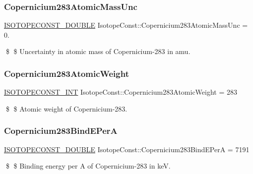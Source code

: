 \subsubsection{\texorpdfstring{Copernicium283\+Atomic\+Mass\+Unc}{Copernicium283AtomicMassUnc}}
{\footnotesize\ttfamily \mbox{\hyperlink{group___isotope_const-_macros_ga8f45a7272ce02c0b4c65c44636ed719a}{I\+S\+O\+T\+O\+P\+E\+C\+O\+N\+S\+T\+\_\+\+D\+O\+U\+B\+LE}} Isotope\+Const\+::\+Copernicium283\+Atomic\+Mass\+Unc = 0.}

\$ \$ Uncertainty in atomic mass of Copernicium-\/283 in amu. \mbox{\label{group___isotope_const-_copernicium-_cn283_ga2036d7cb39096d47da7e7fb48fffa395}} 
\subsubsection{\texorpdfstring{Copernicium283\+Atomic\+Weight}{Copernicium283AtomicWeight}}
{\footnotesize\ttfamily \mbox{\hyperlink{group___isotope_const-_macros_ga5f18360b3e99483a35c32d789e62621c}{I\+S\+O\+T\+O\+P\+E\+C\+O\+N\+S\+T\+\_\+\+I\+NT}} Isotope\+Const\+::\+Copernicium283\+Atomic\+Weight = 283}

\$ \$ Atomic weight of Copernicium-\/283. \mbox{\label{group___isotope_const-_copernicium-_cn283_gac5bb7a19ffcc44ecf3b23b838dceaf57}} 
\subsubsection{\texorpdfstring{Copernicium283\+Bind\+E\+PerA}{Copernicium283BindEPerA}}
{\footnotesize\ttfamily \mbox{\hyperlink{group___isotope_const-_macros_ga8f45a7272ce02c0b4c65c44636ed719a}{I\+S\+O\+T\+O\+P\+E\+C\+O\+N\+S\+T\+\_\+\+D\+O\+U\+B\+LE}} Isotope\+Const\+::\+Copernicium283\+Bind\+E\+PerA = 7191}

\$ \$ Binding energy per A of Copernicium-\/283 in keV. \mbox{\label{group___isotope_const-_copernicium-_cn283_gaf11e445748ea03815c297799d4cf5ee0}} 
